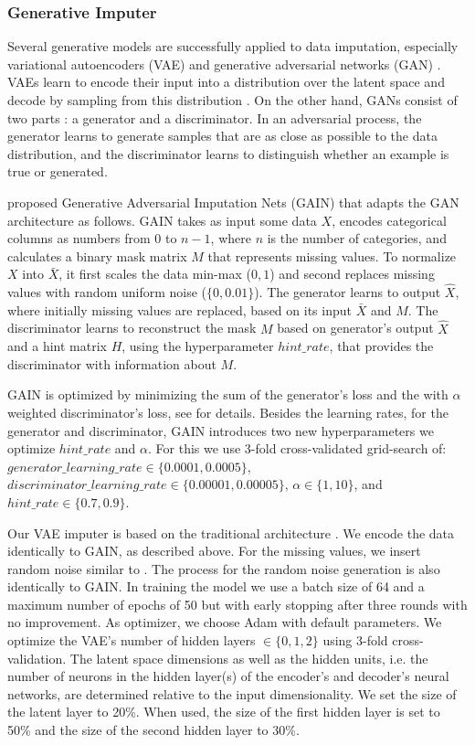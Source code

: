 \subsubsection{Generative Imputer}
%
Several generative models are successfully applied to data imputation, especially variational autoencoders (VAE) \citep{HIVAE, VAE_for_genomic_data, VAEM} and generative adversarial networks (GAN) \citep{GAIN, VIGAN, MisGAN}. VAEs learn to encode their input into a distribution over the latent space and decode by sampling from this distribution \citep{VAE}. On the other hand, GANs consist of two parts \citep{GAN}: a generator and a discriminator. In an adversarial process, the generator learns to generate samples that are as close as possible to the data distribution, and the discriminator learns to distinguish whether an example is true or generated.

\cite{GAIN} proposed Generative Adversarial Imputation Nets (GAIN) that adapts the GAN architecture as follows. GAIN takes as input some data $X$, encodes categorical columns as numbers from $0$ to $n-1$, where $n$ is the number of categories, and calculates a binary mask matrix $M$ that represents missing values. To normalize $X$ into $\bar{X}$, it first scales the data min-max ($0, 1$) and second replaces missing values with random uniform noise ($\{0, 0.01\}$). The generator learns to output $\hat{X}$, where initially missing values are replaced, based on its input $\bar{X}$ and $M$. The discriminator learns to reconstruct the mask $M$ based on generator's output $\hat{X}$ and a hint matrix $H$, using the hyperparameter $hint\_rate$, that provides the discriminator with information about $M$.

GAIN is optimized by minimizing the sum of the generator's loss and the with $\alpha$ weighted discriminator's loss, see \cite{GAIN} for details. Besides the learning rates, for the generator and discriminator, GAIN introduces two new hyperparameters we optimize $hint\_rate$ and $\alpha$. For this we use 3-fold cross-validated grid-search of: $generator\_learning\_rate \in \{0.0001, 0.0005\}$, $discriminator\_learning\_rate \in \{0.00001, 0.00005\}$, $\alpha \in \{1, 10\}$, and $hint\_rate \in \{0.7, 0.9\}$.

Our VAE imputer is based on the traditional architecture \citep{VAE}. We encode the data identically to GAIN, as described above. For the missing values, we insert random noise similar to \cite{CaminoVAE}. The process for the random noise generation is also identically to GAIN. In training the model we use a batch size of 64 and a maximum number of epochs of 50 but with early stopping after three rounds with no improvement. As optimizer, we choose Adam with default parameters. We optimize the VAE's number of hidden layers $\in \{0, 1, 2\}$ using 3-fold cross-validation. The latent space dimensions as well as the hidden units, i.e. the number of neurons in the hidden layer(s) of the encoder's and decoder's neural networks, are determined relative to the input dimensionality. We set the size of the latent layer to 20\%. When used, the size of the first hidden layer is set to 50\% and the size of the second hidden layer to 30\%.

